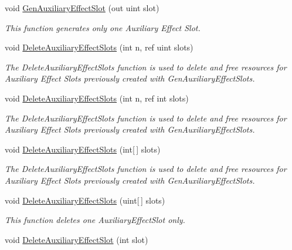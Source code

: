\begin{DoxyCompactItemize}
void \hyperlink{class_open_t_k_1_1_audio_1_1_open_a_l_1_1_effects_extension_a24c835355ade23ba84783d3635692657}{Gen\-Auxiliary\-Effect\-Slot} (out uint slot)
\begin{DoxyCompactList}\small\item\em This function generates only one Auxiliary Effect Slot.\end{DoxyCompactList}\item 
void \hyperlink{class_open_t_k_1_1_audio_1_1_open_a_l_1_1_effects_extension_a0d1cd18f9849786ed616c1e5d6b5f9d1}{Delete\-Auxiliary\-Effect\-Slots} (int n, ref uint slots)
\begin{DoxyCompactList}\small\item\em The Delete\-Auxiliary\-Effect\-Slots function is used to delete and free resources for Auxiliary Effect Slots previously created with Gen\-Auxiliary\-Effect\-Slots.\end{DoxyCompactList}\item 
void \hyperlink{class_open_t_k_1_1_audio_1_1_open_a_l_1_1_effects_extension_a95e2e236996c0bba5ec3ba121a86fb96}{Delete\-Auxiliary\-Effect\-Slots} (int n, ref int slots)
\begin{DoxyCompactList}\small\item\em The Delete\-Auxiliary\-Effect\-Slots function is used to delete and free resources for Auxiliary Effect Slots previously created with Gen\-Auxiliary\-Effect\-Slots.\end{DoxyCompactList}\item 
void \hyperlink{class_open_t_k_1_1_audio_1_1_open_a_l_1_1_effects_extension_a3e5c95d28a8e1b9d6f41e7338a9d9c20}{Delete\-Auxiliary\-Effect\-Slots} (int\mbox{[}$\,$\mbox{]} slots)
\begin{DoxyCompactList}\small\item\em The Delete\-Auxiliary\-Effect\-Slots function is used to delete and free resources for Auxiliary Effect Slots previously created with Gen\-Auxiliary\-Effect\-Slots.\end{DoxyCompactList}\item 
void \hyperlink{class_open_t_k_1_1_audio_1_1_open_a_l_1_1_effects_extension_a32eada847b7327635c6811f398550678}{Delete\-Auxiliary\-Effect\-Slots} (uint\mbox{[}$\,$\mbox{]} slots)
\begin{DoxyCompactList}\small\item\em This function deletes one Auxiliary\-Effect\-Slot only.\end{DoxyCompactList}\item 
void \hyperlink{class_open_t_k_1_1_audio_1_1_open_a_l_1_1_effects_extension_a186a9280ce62e17b093268c3ee63553d}{Delete\-Auxiliary\-Effect\-Slot} (int slot)

\end{DoxyCompactItemize}
